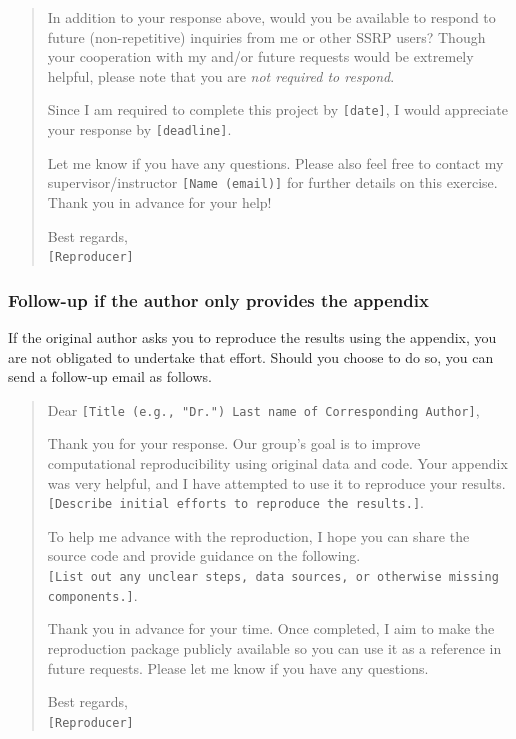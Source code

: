 \documentclass[
]{book}
\begin{document}
\begin{quote}
In addition to your response above, would you be available to respond to future (non-repetitive) inquiries from me or other SSRP users? Though your cooperation with my and/or future requests would be extremely helpful, please note that you are \emph{not required to respond}.

Since I am required to complete this project by \texttt{{[}date{]}}, I would appreciate your response by \texttt{{[}deadline{]}}.

Let me know if you have any questions. Please also feel free to contact my supervisor/instructor \texttt{{[}Name\ (email){]}} for further details on this exercise. Thank you in advance for your help!

Best regards,\\
\texttt{{[}Reproducer{]}}
\end{quote}

\hypertarget{follow-up-if-the-author-only-provides-the-appendix}{%
\subsubsection{Follow-up if the author only provides the appendix}\label{follow-up-if-the-author-only-provides-the-appendix}}

If the original author asks you to reproduce the results using the appendix, you are not obligated to undertake that effort. Should you choose to do so, you can send a follow-up email as follows.

\begin{quote}
Dear \texttt{{[}Title\ (e.g.,\ "Dr.")\ Last\ name\ of\ Corresponding\ Author{]}},

Thank you for your response. Our group's goal is to improve computational reproducibility using original data and code. Your appendix was very helpful, and I have attempted to use it to reproduce your results.\texttt{{[}Describe\ initial\ efforts\ to\ reproduce\ the\ results.{]}}.

To help me advance with the reproduction, I hope you can share the source code and provide guidance on the following. \texttt{{[}List\ out\ any\ unclear\ steps,\ data\ sources,\ or\ otherwise\ missing\ components.{]}}.

Thank you in advance for your time. Once completed, I aim to make the reproduction package publicly available so you can use it as a reference in future requests. Please let me know if you have any questions.

Best regards,\\
\texttt{{[}Reproducer{]}}
\end{quote}
\end{document}
